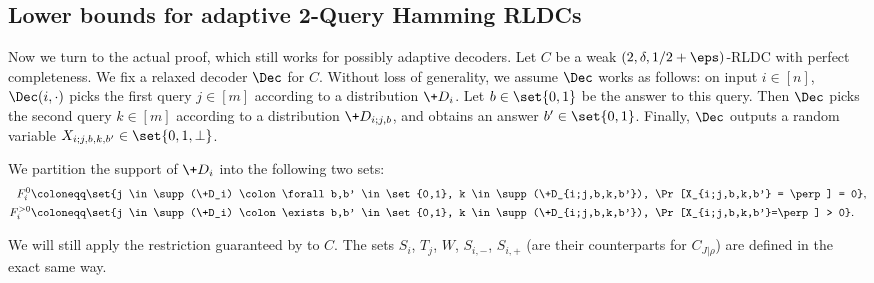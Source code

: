 \subsection{Lower bounds for adaptive 2-Query Hamming RLDCs} \label{subsec:adaptive-2qRLDC}
Now we turn to the actual proof, which still works for possibly adaptive decoders. Let $C$ be a weak $(2,\delta,1/2+\eps)$-RLDC with perfect completeness. We fix a relaxed decoder $\Dec$ for $C$. Without loss of generality, we assume $\Dec$ works as follows: on input $i \in [n]$, $\Dec(i,\cdot)$ picks the first query $j \in [m]$ according to a distribution $\+D_i$. Let $b \in \set{0,1}$ be the answer to this query. Then $\Dec$ picks the second query $k \in [m]$ according to a distribution $\+D_{i;j,b}$, and obtains an answer $b' \in \set{0,1}$. Finally, $\Dec$ outputs a random variable $X_{i;j,b,k,b'}\in \set{0,1,\perp}$. 

We partition the support of $\+D_i$ into the following two sets:
\begin{align*}
	F_i^{0} &\coloneqq \set{j \in \supp(\+D_i) \colon \forall b,b' \in \set{0,1}, k \in \supp(\+D_{i;j,b,k,b'}), \Pr[X_{i;j,b,k,b'} = \perp] = 0}, \\
	F_i^{>0} &\coloneqq \set{j \in \supp(\+D_i) \colon \exists b,b' \in \set{0,1}, k \in \supp(\+D_{i;j,b,k,b'}), \Pr[X_{i;j,b,k,b'}=\perp] > 0}.
\end{align*}

We will still apply the restriction guaranteed by  to $C$. The sets $S_i$, $T_j$, $W$, $S_{i,-}$, $S_{i,+}$ (are their counterparts for $C_{J|\rho}$) are defined in the exact same way.

